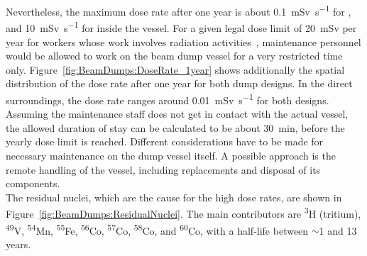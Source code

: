 Nevertheless, the maximum dose rate after one year is about \SI{0.1}{\milli\sievert\per\second} for \designone, and \SI{10}{\milli\sievert\per\second} for \designtwo inside the vessel.
For a given legal dose limit of \SI{20}{\milli\sievert} per year for workers whose work involves radiation activities~\cite{Strahlenschutz}, maintenance personnel would be allowed to work on the beam dump vessel for a very restricted time only.
Figure~\ref{fig:BeamDumps:DoseRate_1year} shows additionally the spatial distribution of the dose rate after one year for both dump designs.
In the direct surroundings, the dose rate ranges around \SI{0.01}{\milli\sievert\per\second} for both designs.
Assuming the maintenance staff does not get in contact with the actual vessel, the allowed duration of stay can be calculated to be about \SI{30}{\minute}, before the yearly dose limit is reached.
Different considerations have to be made for necessary maintenance on the dump vessel itself.
A possible approach is the remote handling of the vessel, including replacements and disposal of its components.
\\The residual nuclei, which are the cause for the high dose rates, are shown in Figure~\ref{fig:BeamDumps:ResidualNuclei}.
The main contributors are \textsuperscript{3}H (tritium), \textsuperscript{49}V, \textsuperscript{54}Mn, \textsuperscript{55}Fe, \textsuperscript{56}Co, \textsuperscript{57}Co, \textsuperscript{58}Co, and \textsuperscript{60}Co, with a half-life between $\sim$1 and 13 years.
